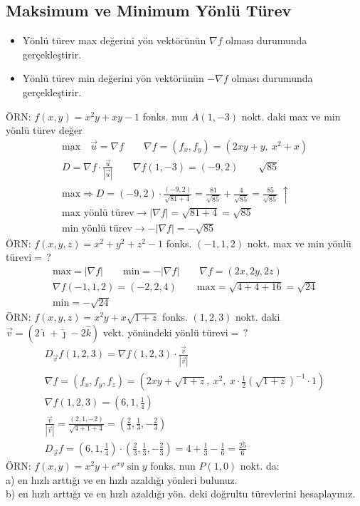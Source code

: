 \documentclass[11pt,a4paper]{article}
\begin{document}
\subsection{Maksimum ve Minimum Yönlü Türev}
\begin{itemize}[label=$\ast$,nosep]
\item Yönlü türev max değerini yön vektörünün $\nabla f$ olması durumunda gerçekleştirir.
\item Yönlü türev min değerini yön vektörünün $-\nabla f$ olması durumunda gerçekleştirir.
\end{itemize}
ÖRN: $f(x,y)=x^2y+xy-1$ fonks. nun $A(1,-3)$ nokt. daki max ve min yönlü türev değer
\begin{gather*}
\underline{\text{max}}\quad\vec{u}=\nabla f\qquad\nabla f=(f_x,f_y)=(2xy+y,\ x^2+x)\\
D=\nabla f\cdot\frac{\vec{u}}{|\vec{u}|}\qquad\nabla f(1,-3)=(-9,2)\qquad\sqrt{85}\\
\text{max}\Rightarrow D=(-9,2)\cdot\frac{(-9,2)}{\sqrt{81+4}}=\frac{81}{\sqrt{85}}+\frac{4}{\sqrt{85}}=\frac{85}{\sqrt{85}}\ \uparrow\\
\text{max yönlü türev}\to|\nabla f|=\sqrt{81+4}=\sqrt{85}\\
\text{min yönlü türev}\to-|\nabla f|=-\sqrt{85}
\end{gather*}
ÖRN: $f(x,y,z)=x^2+y^2+z^2-1$ fonks. $(-1,1,2)$ nokt. max ve min yönlü türevi$=\,?$
\begin{gather*}
\text{max}=|\nabla f|\qquad\text{min}=-|\nabla f|\qquad\nabla f=(2x,2y,2z)\\
\nabla f(-1,1,2)=(-2,2,4)\qquad\text{max}=\sqrt{4+4+16}=\sqrt{24}\\
\text{min}=-\sqrt{24}
\end{gather*}
ÖRN: $f(x,y,z)=x^2y+x\sqrt{1+z}$ fonks. $(1,2,3)$ nokt. daki $\vec{v}=(2\hat{\imath}+\hat{\jmath}-2\hat{k})$ vekt. yönündeki yönlü türevi$=\,?$
\begin{gather*}
D_{\vec{v}}f(1,2,3)=\nabla f(1,2,3)\cdot\frac{\vec{v}}{|\vec{v}|}\\
\nabla f=(f_x,f_y,f_z)=\left(2xy+\sqrt{1+z},\ x^2,\ x\cdot\frac12\left(\sqrt{1+z}\right)^{-1}\cdot1\right)\\
\nabla f(1,2,3)=\left(6,1,\frac14\right)\\
\frac{\vec{v}}{|\vec{v}|}=\frac{(2,1,-2)}{\sqrt{4+1+4}}=\left(\frac23,\frac13,-\frac23\right)\\
D_{\vec{v}}f=\left(6,1,\frac14\right)\cdot\left(\frac23,\frac13,-\frac23\right)=4+\frac13-\frac16=\frac{25}{6}
\end{gather*}
ÖRN: $f(x,y)=x^2y+e^{xy}\sin y$ fonks. nun $P(1,0)$ nokt. da:\\
a) en hızlı arttığı ve en hızlı azaldığı yönleri bulunuz.\\
b) en hızlı arttığı ve en hızlı azaldığı yön. deki doğrultu türevlerini hesaplayınız.
\end{document}

